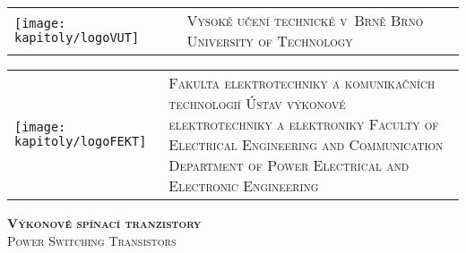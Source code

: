\newcommand{\nazov}{\textit{Výkonové spínací tranzistory} }
\newcommand{\typprace}{semestráln}


\thispagestyle{empty}

%
%
%

\noindent
\begin{tabular}{p{}  p{} }
	\vspace{48pt}\texttt{[image: kapitoly/logoVUT]} & 
	\large\textsc{Vysoké učení technické v~Brně} \newline \footnotesize{} \newline
	\normalsize\textsc{Brno University of Technology}
\end{tabular}
\par

\noindent
\begin{tabular}{p{}  p{} }
	\vspace{56pt}\texttt{[image: kapitoly/logoFEKT]} & 
	\normalsize\textsc{Fakulta elektrotechniky a komunikačních technologií} \newline
	\normalsize\textsc{Ústav výkonové elektrotechniky a elektroniky} \newline
	\newline 
	\small\textsc{Faculty of Electrical Engineering and Communication} \newline
	\small\textsc{Department of Power Electrical and Electronic Engineering}
\end{tabular}
\par

\vspace{96pt}
\begin{center}
\LARGE\textsc{\textbf{Výkonové spínací tranzistory\\}}
\vspace{12pt}
\large\textsc{Power Switching Transistors}
\end{center}
\par

